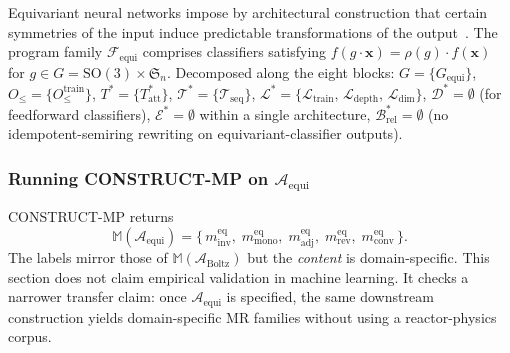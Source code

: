 \documentclass[acmsmall, screen]{acmart}
\begin{document}
Equivariant neural networks impose by architectural construction that certain symmetries of the input induce predictable transformations of the output~\cite{CohenWelling2016, ThomasSmidt2018, KondorTrivedi2018, Bronstein2021GDL}. The program family $\mathcal{F}_{\mathrm{equi}}$ comprises classifiers satisfying $f(g\cdot \mathbf{x}) = \rho(g)\cdot f(\mathbf{x})$ for $g \in G = \mathrm{SO}(3) \times \mathfrak{S}_n$. Decomposed along the eight blocks: $G = \{G_{\mathrm{equi}}\}$, $O_{\le} = \{O_{\le}^{\mathrm{train}}\}$, $T^{*} = \{T^{*}_{\mathrm{att}}\}$, $\mathcal{T}^{*} = \{\mathcal{T}_{\mathrm{seq}}\}$, $\mathcal{L}^{*} = \{\mathcal{L}_{\mathrm{train}},\, \mathcal{L}_{\mathrm{depth}},\, \mathcal{L}_{\mathrm{dim}}\}$, $\mathcal{D}^{*} = \emptyset$ (for feedforward classifiers), $\mathcal{E}^{*} = \emptyset$ within a single architecture, $\mathcal{B}^{*}_{\mathrm{rel}} = \emptyset$ (no idempotent-semiring rewriting on equivariant-classifier outputs).

\subsubsection{Running CONSTRUCT-MP on \texorpdfstring{$\mathcal{A}_{\mathrm{equi}}$}{A\_equi}}

CONSTRUCT-MP returns
$$\mathbb{M}(\mathcal{A}_{\mathrm{equi}}) = \bigl\{\,m^{\mathrm{eq}}_{\mathrm{inv}},\; m^{\mathrm{eq}}_{\mathrm{mono}},\; m^{\mathrm{eq}}_{\mathrm{adj}},\; m^{\mathrm{eq}}_{\mathrm{rev}},\; m^{\mathrm{eq}}_{\mathrm{conv}}\,\bigr\}.$$
The labels mirror those of $\mathbb{M}(\mathcal{A}_{\mathrm{Boltz}})$ but the \emph{content} is domain-specific. This section does not claim empirical validation in machine learning. It checks a narrower transfer claim: once $\mathcal{A}_{\mathrm{equi}}$ is specified, the same downstream construction yields domain-specific MR families without using a reactor-physics corpus.
\end{document}
